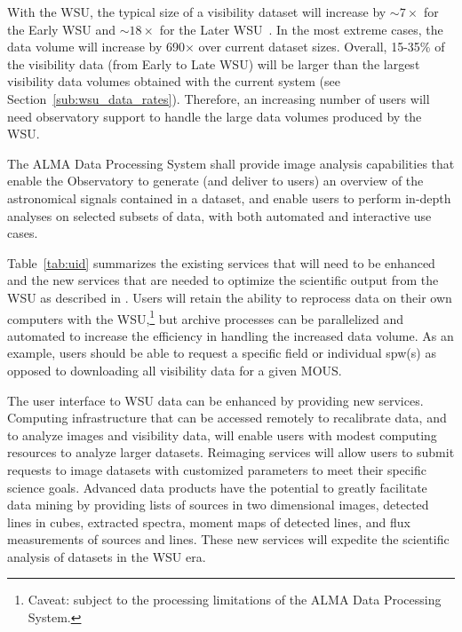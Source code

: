 With the WSU, the typical size of a visibility dataset will increase by $\sim7\times$ for the Early WSU and $\sim18\times$  for the Later WSU~\cite{drru_mean}. In the most extreme cases, the data volume will increase by 690$\times$ over current dataset sizes. Overall, 15-35\% of the visibility data (from Early to Late WSU) will be larger than the largest visibility data volumes obtained with the current system (see Section~\ref{sub:wsu_data_rates}). Therefore, an increasing number of users will need observatory support to handle the large data volumes produced by the WSU.

The ALMA Data Processing System shall provide image analysis capabilities that enable the Observatory to generate (and deliver to users) an overview of the astronomical signals contained in a dataset, and enable users to perform in-depth analyses on selected subsets of data, with both automated and interactive use cases.

Table~\ref{tab:uid} summarizes the existing services that will need to be enhanced and the new services that are needed to optimize the scientific output from the WSU as described in \cite{uid}. Users will retain the ability to reprocess data on their own computers with the WSU,\footnote{Caveat: subject to the processing limitations of the ALMA Data Processing System.} but archive processes can be parallelized and automated to increase the efficiency in handling the increased data volume. As an example, users should be able to request a specific field or individual spw(s) as opposed to downloading all visibility data for a given MOUS. 

The user interface to WSU data can be enhanced by providing new services. Computing infrastructure that can be accessed remotely to recalibrate data, and to analyze images and visibility data, will enable users with modest computing resources to analyze larger datasets. Reimaging services will allow users to submit requests to image datasets with customized parameters to meet their specific science goals. Advanced data products have the potential to greatly facilitate data mining by providing lists of sources in two dimensional images, detected lines in cubes, extracted spectra, moment maps of detected lines, and flux measurements of sources and lines. These new services will expedite the scientific analysis of datasets in the WSU era.



